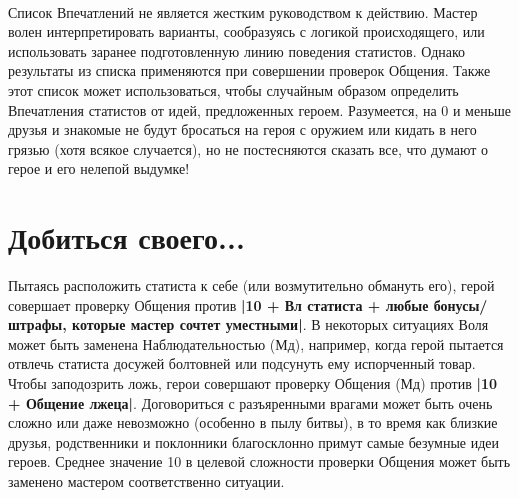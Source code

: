\paragraph{}
Список Впечатлений не является жестким руководством к действию. Мастер волен интерпретировать варианты, сообразуясь с логикой происходящего, или использовать заранее подготовленную линию поведения статистов. Однако результаты из списка применяются при совершении проверок Общения.
\newline
Также этот список может использоваться, чтобы случайным образом определить Впечатления статистов от идей, предложенных героем. Разумеется, на 0 и меньше друзья и знакомые не будут бросаться на героя с оружием или кидать в него грязью (хотя всякое случается), но не постесняются сказать все, что думают о герое и его нелепой выдумке!
\section{Добиться своего...}
Пытаясь расположить статиста к себе (или возмутительно обмануть его), герой совершает проверку Общения против \textbf{|10 + Вл статиста + любые бонусы/штрафы, которые мастер сочтет уместными|}. В некоторых ситуациях Воля может быть заменена Наблюдательностью (Мд), например, когда герой пытается отвлечь статиста досужей болтовней или подсунуть ему испорченный товар. Чтобы заподозрить ложь, герои совершают проверку Общения (Мд) против \textbf{|10 + Общение лжеца|}. Договориться с разъяренными врагами может быть очень сложно или даже невозможно (особенно в пылу битвы), в то время как близкие друзья, родственники и поклонники благосклонно примут самые безумные идеи героев. Среднее значение 10 в целевой сложности проверки Общения может быть заменено мастером соответственно ситуации.

